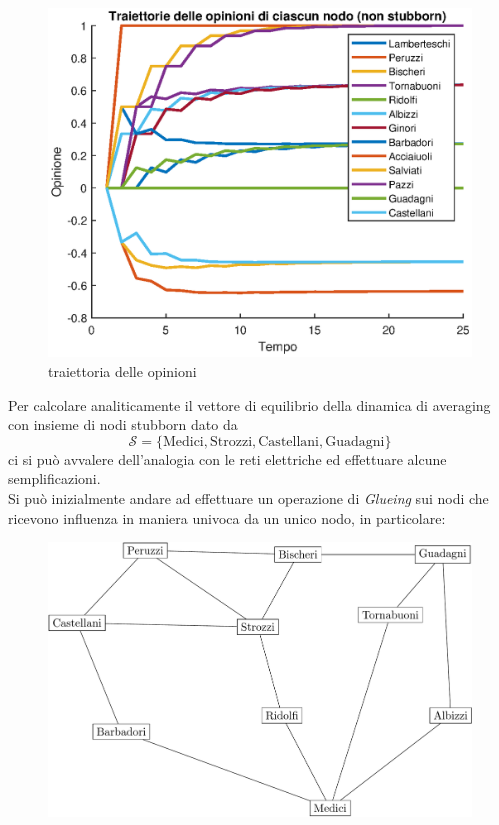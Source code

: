 \documentclass[11pt,largemargins]{homework}
\begin{document}
\begin{alphaparts}
\begin{figure}
    \includegraphics[scale=0.6]{Traiettoria_opinioni.eps}
    \caption{traiettoria delle opinioni}
  \end{figure}
 \newpage
\questionpart

  Per calcolare analiticamente il vettore di equilibrio della dinamica di averaging con insieme di nodi stubborn dato da $$\mathcal{S}=\{\text{Medici}, \text{Strozzi}, \text{Castellani}, \text{Guadagni}\}$$ ci si può avvalere dell'analogia con le reti elettriche ed effettuare alcune semplificazioni.
  \\
  Si può inizialmente andare ad effettuare un operazione di \textit{Glueing} sui nodi che ricevono influenza in maniera univoca da un unico nodo, in particolare:

  \begin{figure}
    \center
     \includegraphics[scale=0.35]{Graph_Glueing.png}
  \end{figure}


\end{alphaparts}
\end{document}
